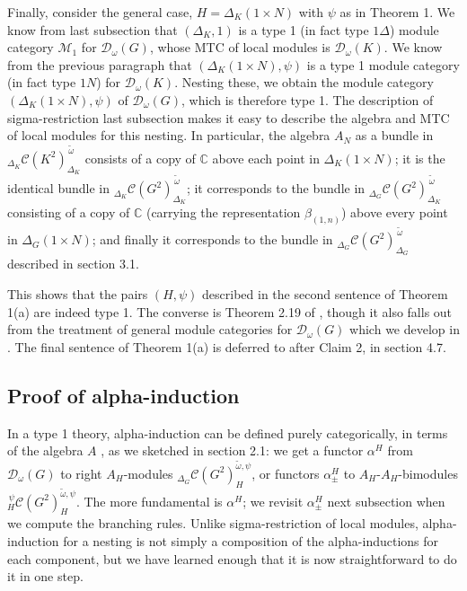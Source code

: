 \documentclass[12pt]{article}
\numberwithin{equation}{section}
\def\cC            {{\mathcal{C}}}
\def\cD            {{\mathcal{D}}}
\def\cM            {{\mathcal{M}}}
\def\bbC           {\mathbb{C}}
\begin{document}
Finally, consider the general case, $H=\Delta_K(1\times N)$ with $\psi$ as in Theorem 1. We know from last subsection that $(\Delta_K,1)$ is a type 1 (in fact type $1\Delta$) module category $\cM_1$ for 
$\cD_\omega(G)$, whose MTC of local modules is $\cD_\omega(K)$. We know from the previous paragraph that $(\Delta_K(1\times N),\psi)$ is a type 1 module category (in fact type $1N$) for $\cD_\omega(K)$. Nesting these, we obtain the module category $(\Delta_K(1\times N),\psi)$ of
$\cD_\omega(G)$, which is therefore type 1. The description of sigma-restriction last subsection
makes it easy to describe the algebra and MTC of local modules for this nesting. In particular, the
algebra $A_N$ as a bundle in ${}_{\Delta_K}\cC(K^2)_{\Delta_K}^{\,\tilde{\omega}}$ consists
of a copy of $\bbC$ above each point in $\Delta_K(1\times N)$; it is the identical bundle in ${}_{\Delta_K}\cC(G^2)_{\Delta_K}^{\,\tilde{\omega}}$; it corresponds to the bundle in ${}_{\Delta_G}\cC(G^2)_{\Delta_K}^{\,\tilde{\omega}}$ consisting of a copy of $\bbC$ (carrying the representation $\beta_{(1,n)}$) above every point in $\Delta_G(1\times N)$; and finally it corresponds to the bundle  in ${}_{\Delta_G}\cC(G^2)_{\Delta_G}^{\,\tilde{\omega}}$ described in section 3.1.

This shows that the pairs $(H,\psi)$ described in the second sentence of Theorem 1(a) are indeed type 1. The converse is Theorem 2.19 of \cite{Dav3}, though it also falls out from the 
treatment of general module categories for $\cD_\omega(G)$ which we develop in \cite{EG8}. The final sentence of Theorem 1(a) is deferred to after Claim 2, in section 4.7.




\subsection{{Proof of alpha-induction}}

In a type 1 theory, alpha-induction can be defined purely categorically, in terms of the
algebra $A$  \cite{KO}, as we sketched in section 2.1: we get a functor $\alpha^H$ from $\cD_\omega(G)$
to right $A_H$-modules ${}_{\Delta_G}\cC(G^2)^{\tilde{\omega},\psi}_H$, or functors 
$\alpha^H_\pm$ to $A_H$-$A_H$-bimodules ${}_{H}^{\,\psi}\cC(G^2)^{\tilde{\omega},\psi}_{H}$. 
The more fundamental is $\alpha^H$; we revisit $\alpha^H_\pm$ next subsection
when we compute the branching rules. Unlike sigma-restriction of local modules, alpha-induction for a nesting is not
simply a composition of the alpha-inductions for each component, but we have learned enough that it is now straightforward to do it in one step.
\end{document}
